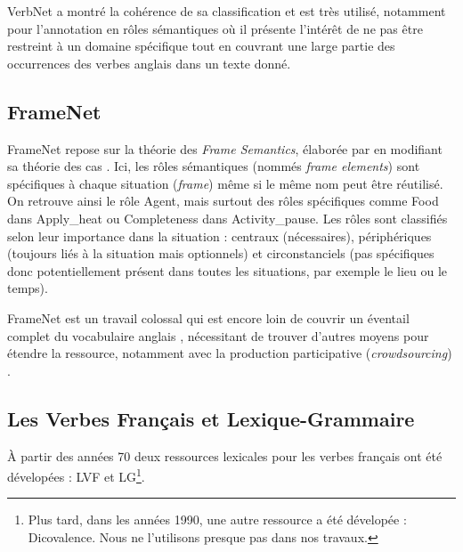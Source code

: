 VerbNet a montré la cohérence de sa classification et est très utilisé,
notamment pour l'annotation en rôles sémantiques
\citep{swier2005exploiting,palmer2013semantic} où il présente l'intérêt de ne
pas être restreint à un domaine spécifique tout en couvrant une large partie
des occurrences des verbes anglais dans un texte donné.

\subsection{FrameNet}
\label{presentation_framenet}

FrameNet \citep{baker1998berkeley} repose sur la théorie des \textit{Frame
Semantics}, élaborée par \cite{fillmore1982frame} en modifiant sa théorie des
cas \citep{fillmore1968case}. Ici, les rôles sémantiques (nommés \textit{frame
elements}) sont spécifiques à chaque situation (\textit{frame}) même si le même
nom peut être réutilisé. On retrouve ainsi le rôle Agent, mais surtout des
rôles spécifiques comme Food dans Apply\_heat ou Completeness dans
Activity\_pause. Les rôles sont classifiés selon leur importance dans la
situation : centraux (nécessaires), périphériques (toujours liés à la situation
mais optionnels) et circonstanciels (pas spécifiques donc potentiellement
présent dans toutes les situations, par exemple le lieu ou le temps).

FrameNet est un travail colossal qui est encore loin de couvrir un éventail
complet du vocabulaire anglais \citep[§5.4]{marquez2008semantic}, nécessitant
de trouver d'autres moyens pour étendre la ressource, notamment avec la
production participative (\emph{crowdsourcing})
\citep{fossati2013outsourcing,baker2014framenet}.



\subsection{Les Verbes Français et Lexique-Grammaire}
\label{sec:lvflg}

À partir des années 70 deux ressources lexicales pour les verbes français ont
été dévelopées : LVF et LG\footnote{Plus tard, dans les années 1990, une autre
    ressource a été dévelopée : Dicovalence. Nous ne l'utilisons presque pas
dans nos travaux.}.

